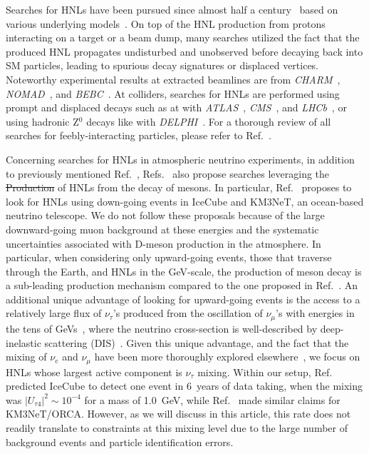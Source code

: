 \documentclass[
    aps,
    prd,
    reprint,
    amsmath,
    amssymb,
    nofootinbib,
    superscriptaddress,
    floatfix
]{revtex4-2}
\newcommand{\gev}{\giga\electronvolt}
\def\nomathut4{|U_{\tau4}|^2}
\providecommand{\DIFaddtex}[1]{{\protect\color{blue}\uwave{#1}}} %
\providecommand{\DIFdeltex}[1]{{\protect\color{red}\sout{#1}}}                      %
\providecommand{\DIFaddbegin}{} %
\providecommand{\DIFaddend}{} %
\providecommand{\DIFdelbegin}{} %
\providecommand{\DIFdelend}{} %
\providecommand{\DIFadd}[1]{\texorpdfstring{\DIFaddtex{#1}}{#1}} %
\providecommand{\DIFdel}[1]{\texorpdfstring{\DIFdeltex{#1}}{}} %
\newcommand{\DIFscaledelfig}{0.5}
\newlength{\DIFdelgraphicswidth} %
\newlength{\DIFdelgraphicsheight} %
\newcommand{\DIFaddincludegraphics}[2][]{{\color{blue}\fbox{\DIFOincludegraphics[#1]{#2}}}} %
\newcommand{\DIFdelincludegraphics}[2][]{%
\sbox{\DIFdelgraphicsbox}{\DIFOincludegraphics[#1]{#2}}%
\settoboxwidth{\DIFdelgraphicswidth}{\DIFdelgraphicsbox} %
\settoboxtotalheight{\DIFdelgraphicsheight}{\DIFdelgraphicsbox} %
\scalebox{\DIFscaledelfig}{%
\parbox[b]{\DIFdelgraphicswidth}{\usebox{\DIFdelgraphicsbox}\\[-\baselineskip] \rule{\DIFdelgraphicswidth}{0em}}\llap{\resizebox{\DIFdelgraphicswidth}{\DIFdelgraphicsheight}{%
\setlength{\unitlength}{\DIFdelgraphicswidth}%
\begin{picture}(1,1)%
\thicklines\linethickness{2pt} %
{\color[rgb]{1,0,0}\put(0,0){\framebox(1,1){}}}%
{\color[rgb]{1,0,0}\put(0,0){\line( 1,1){1}}}%
{\color[rgb]{1,0,0}\put(0,1){\line(1,-1){1}}}%
\end{picture}%
}\hspace*{3pt}}} %
} %
\DeclareRobustCommand{\DIFaddbegin}{\DIFOaddbegin \let\includegraphics\DIFaddincludegraphics} %
\DeclareRobustCommand{\DIFaddend}{\DIFOaddend \let\includegraphics\DIFOincludegraphics} %
\DeclareRobustCommand{\DIFdelbegin}{\DIFOdelbegin \let\includegraphics\DIFdelincludegraphics} %
\DeclareRobustCommand{\DIFdelend}{\DIFOaddend \let\includegraphics\DIFOincludegraphics} %
\begin{document}
Searches for HNLs have been pursued since almost half a century~\cite{Abdullahi:2022jlv} based on various underlying models~\cite{Fernandez-Martinez:2023phj}. On top of the HNL production from protons interacting on a target or a beam dump, many searches utilized the fact that the produced HNL propagates undisturbed and unobserved before decaying back into SM particles, leading to spurious decay signatures or displaced vertices. Noteworthy experimental results at extracted beamlines are from \textit{CHARM}~\cite{CHARM:1983ayi, Orloff:2002de, Boiarska:2021yho}, \textit{NOMAD}~\cite{NOMAD:2001eyx}, and \textit{BEBC}~\cite{Barouki:2022bkt, BEBC_OG_COOPERSARKAR1985207}. At colliders, searches for HNLs are performed using prompt and displaced decays such as at with \textit{ATLAS}~\cite{ATLAS:2019kpx, atlas_2022_HNL_PhysRevLett.131.061803}, \textit{CMS}~\cite{CMS:2018iaf, CMS:2022fut}, and \textit{LHCb}~\cite{LHCb:2020wxx}, or using hadronic Z$^0$ decays like with \textit{DELPHI}~\cite{DELPHI:1996qcc}. For a thorough review of all searches for feebly-interacting particles, please refer to Ref.~\cite{Agrawal:2021dbo}.

Concerning searches for HNLs in atmospheric neutrino experiments, in addition to previously mentioned Ref.~\cite{Coloma:2017ppo}, Refs.~\cite{Boiarska:2021yho,Coloma:2019htx,Arguelles:2019ziu} also propose searches leveraging the \DIFdelbegin \DIFdel{Production }\DIFdelend \DIFaddbegin \DIFadd{production }\DIFaddend of HNLs from the decay of mesons. In particular, Ref.~\cite{Boiarska:2021yho} proposes to look for HNLs using down-going events in IceCube and KM3NeT, an ocean-based neutrino telescope.
We do not follow these proposals because of the large downward-going muon background at these energies and the systematic uncertainties associated with D-meson production in the atmosphere.
In particular, when considering only upward-going events, those that traverse through the Earth, and HNLs in the GeV-scale, the production of meson decay is a sub-leading production mechanism compared to the one proposed in Ref.~\cite{Coloma:2017ppo}.
An additional unique advantage of looking for upward-going events is the access to a relatively large flux of $\nu_\tau$'s produced from the oscillation of $\nu_\mu$'s with energies in the tens of GeVs~\cite{IceCubeCollaboration:2023wtb}, where the neutrino cross-section is well-described by deep-inelastic scattering (DIS)~\cite{Formaggio:2012cpf}.
Given this unique advantage, and the fact that the mixing of $\nu_e$ and $\nu_\mu$ have been more thoroughly explored elsewhere~\cite{ParticleDataGroup:2024cfk}, we focus on HNLs whose largest active component is $\nu_\tau$ mixing.
Within our setup, Ref.~\cite{Coloma:2017ppo} predicted IceCube to detect one event in \SI{6}{years} of data taking, when the mixing was $\nomathut4\sim10^{-4}$ for a mass of \SI{1.0}{\gev}, while Ref.~\cite{Boiarska:2021yho} made similar claims for KM3NeT/ORCA.
However, as we will discuss in this article, this rate does not readily translate to constraints at this mixing level due to the large number of background events and particle identification errors. 
\end{document}
